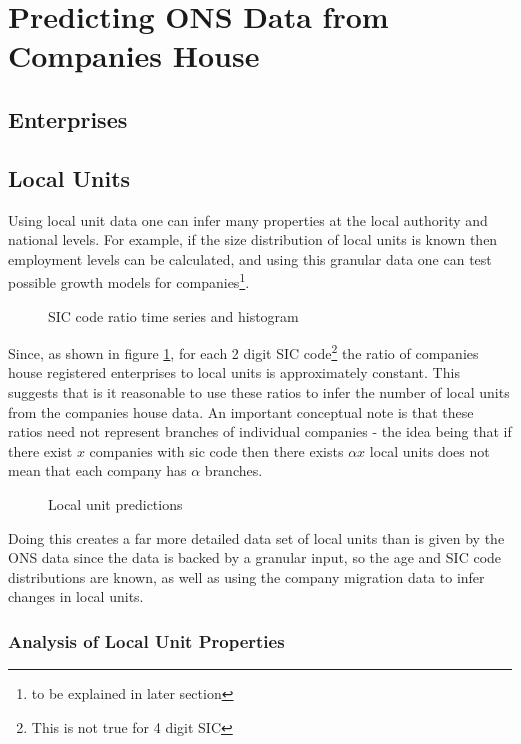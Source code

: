 \documentclass[a4paper,10pt]{article}
\begin{document}
\section{Predicting ONS Data from Companies House}
\subsection{Enterprises}
\subsection{Local Units}
Using local unit data one can infer many properties at the local authority and national levels. For example, if the size distribution of local units is known then employment levels can be calculated, and using this granular data one can test possible growth models for companies\footnote{to be explained in later section}.
\begin{figure}[!ht]
 \caption{SIC code ratio time series and histogram}
 \label{sic_ratio}
\end{figure}

Since, as shown in figure \ref{sic_ratio}, for each 2 digit SIC code\footnote{This is not true for 4 digit SIC} the ratio of companies house registered enterprises to local units is approximately constant. This suggests that is it reasonable to use these ratios to infer the number of local units from the companies house data. An important conceptual note is that these ratios need not represent branches of individual companies - the idea being that if there exist $x$ companies with sic code then there exists $\alpha x$ local units does not mean that each company has $\alpha$ branches.

\begin{figure}[!ht]
 \caption{Local unit predictions}
 \label{local_unit_predictions}
\end{figure}

Doing this creates a far more detailed data set of local units than is given by the ONS data since the data is backed by a granular input, so the age and SIC code distributions are known, as well as using the company migration data to infer changes in local units.

\subsubsection{Analysis of Local Unit Properties}
\end{document}
